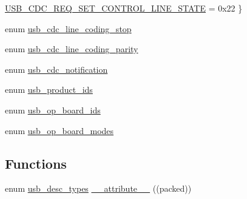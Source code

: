 \begin{DoxyCompactItemize}
\hyperlink{group___p_i_o_s___u_s_b___d_e_f_s_gga3544e22c57aa46b457ffbb09822caf9cabdd798c9c4eae60e6890da87b0821c01}{\-U\-S\-B\-\_\-\-C\-D\-C\-\_\-\-R\-E\-Q\-\_\-\-S\-E\-T\-\_\-\-C\-O\-N\-T\-R\-O\-L\-\_\-\-L\-I\-N\-E\-\_\-\-S\-T\-A\-T\-E} =  0x22
 \}
\item 
enum \hyperlink{group___p_i_o_s___u_s_b___d_e_f_s_ga233bd6f23d9895af9b693654d48af682}{usb\-\_\-cdc\-\_\-line\-\_\-coding\-\_\-stop} 
\item 
enum \hyperlink{group___p_i_o_s___u_s_b___d_e_f_s_gabc1f843b2823e8539facdbfeb734a5ad}{usb\-\_\-cdc\-\_\-line\-\_\-coding\-\_\-parity} 
\item 
enum \hyperlink{group___p_i_o_s___u_s_b___d_e_f_s_ga43113e1b9daab7bfc6e5fe6ff65b0fc7}{usb\-\_\-cdc\-\_\-notification} 
\item 
enum \hyperlink{group___p_i_o_s___u_s_b___d_e_f_s_gadd6f0f6378e0d944dffb726322ae5ddf}{usb\-\_\-product\-\_\-ids} 
\item 
enum \hyperlink{group___p_i_o_s___u_s_b___d_e_f_s_gaa03fd2fa7b7aa69d420bfea86dc519d3}{usb\-\_\-op\-\_\-board\-\_\-ids} 
\item 
enum \hyperlink{group___p_i_o_s___u_s_b___d_e_f_s_gafbdcb00e985ba79973c56e1da0a87635}{usb\-\_\-op\-\_\-board\-\_\-modes} 
\end{DoxyCompactItemize}
\subsection*{\-Functions}
\begin{DoxyCompactItemize}
\item 
enum \hyperlink{group___p_i_o_s___u_s_b___d_e_f_s_ga15dc30e657ffe4355ba53c2254eb28b5}{usb\-\_\-desc\-\_\-types} \hyperlink{group___p_i_o_s___u_s_b___d_e_f_s_ga3d1234b86c1e07d3decb640d63f05771}{\-\_\-\-\_\-attribute\-\_\-\-\_\-} ((packed))
\end{DoxyCompactItemize}
